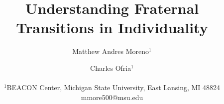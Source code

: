 \documentclass[letterpaper]{article}
\title{Understanding Fraternal Transitions in Individuality}
\author{Matthew Andres Moreno$^{1}$ \and Charles Ofria$^{1}$ \\
\mbox{}\\
$^1$BEACON Center, Michigan State University, East Lansing, MI 48824 \\
mmore500@msu.edu} %
\begin{document}
\maketitle













\footnotesize

\end{document}
